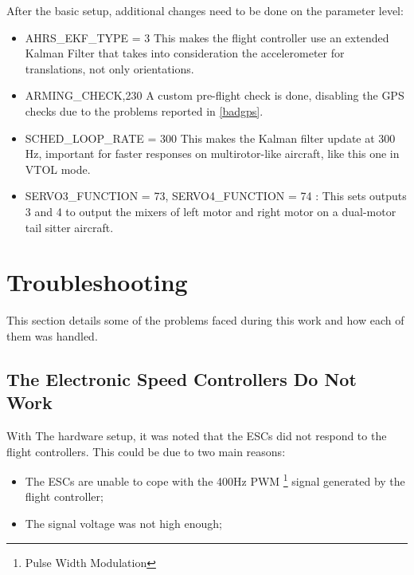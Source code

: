 After the basic setup, additional changes need to be done on the parameter level:
\begin{itemize}
\item AHRS\_EKF\_TYPE = 3 This makes the flight controller use an extended Kalman Filter that takes into consideration the accelerometer for translations, not only orientations.

\item ARMING\_CHECK,230 A custom pre-flight check is done, disabling the GPS checks due to the problems reported in \ref{badgps}.

\item SCHED\_LOOP\_RATE = 300 This makes the Kalman filter update at 300 Hz, important for faster responses on multirotor-like aircraft, like this one in VTOL mode.

\item SERVO3\_FUNCTION = 73, SERVO4\_FUNCTION = 74 : This sets outputs 3 and 4 to output the mixers of left motor and right motor on a dual-motor tail sitter aircraft.

\end{itemize}




\section{Troubleshooting}

This section details some of the problems faced during this work and how each of them was handled.

\subsection{The Electronic Speed Controllers Do Not Work}
With The hardware setup, it was noted that the ESCs did not respond to the flight controllers. This could be due to two main reasons:
\begin{itemize}
\item The ESCs are unable to cope with the 400Hz PWM \footnote{Pulse Width Modulation} signal generated by the flight controller;
\item The signal voltage was not high enough;
\end{itemize}

